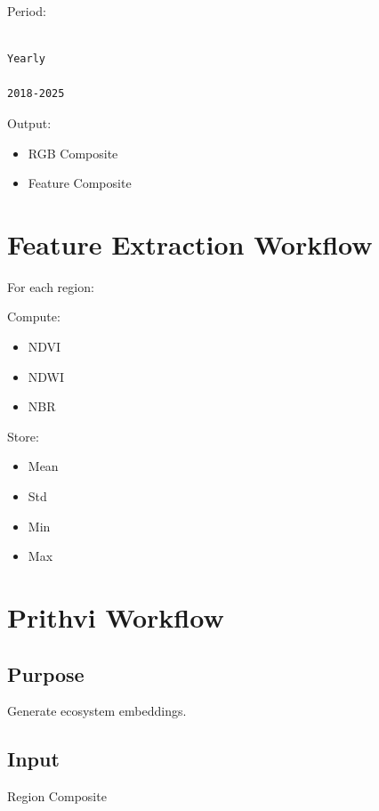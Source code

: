 \documentclass[11pt,a4paper]{article}
\begin{document}
Period:

\begin{verbatim}

Yearly

2018-2025

\end{verbatim}

Output:

\begin{itemize}
\item RGB Composite
\item Feature Composite
\end{itemize}

\section{Feature Extraction Workflow}

For each region:

Compute:

\begin{itemize}
\item NDVI
\item NDWI
\item NBR
\end{itemize}

Store:

\begin{itemize}
\item Mean
\item Std
\item Min
\item Max
\end{itemize}

\section{Prithvi Workflow}

\subsection{Purpose}

Generate ecosystem embeddings.

\subsection{Input}

Region Composite
\end{document}
